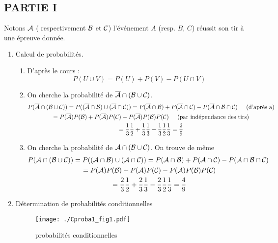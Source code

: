 \subsection*{PARTIE I}
Notons  $\cal A$ ( respectivement $\cal B$ et $\cal C$) l'événement $A$ (resp. $B$, $C$) réussit son tir à une épreuve donnée.
\begin{enumerate}
\item Calcul de probabilités.
\begin{enumerate}
\item  D'après le cours : $$P(U\cup V)=P(U)+P(V)-P(U\cap V)$$
 \item  On cherche la probabilité de $\overline{{\cal A}}\cap({\cal B}\cup {\cal C)}$.
 \begin{multline*}
 P(\overline{{\cal A}}\cap({\cal B}\cup {\cal C)}) 
  = P((\overline{{\cal A}}\cap{\cal B})\cup (\overline{{\cal A}}\cap{\cal C)})
  = P(\overline{{\cal A}}\cap{\cal B})+P(\overline{{\cal A}}\cap{\cal C}) -P(\overline{{\cal A}}\cap{\cal B}\cap{\cal C}) \hspace{0.5cm}\text{(d'après a)}\\
  = P(\overline{{\cal A}})P({\cal B}) +P(\overline{{\cal A}})P({\cal C}) - P(\overline{{\cal A}})P({\cal B})P({\cal C})
 \hspace{0.5cm}\text{(par indépendance des tirs)}\\
 = \frac 13\frac12+\frac13\frac13-\frac13\frac12\frac13 
 = \frac29
 \end{multline*}
 
\item On cherche la probabilité de ${\cal A}\cap({\cal B}\cup {\cal C)}$. On trouve de même
 \begin{multline*}
 P({{\cal A}}\cap({\cal B}\cup {\cal C)})
  = P(({{\cal A}}\cap{\cal B})\cup ({{\cal A}}\cap{\cal C)})
  = P({{\cal A}}\cap{\cal B})+P({{\cal A}}\cap{\cal C}) -P({{\cal A}}\cap{\cal B}\cap{\cal C})\ \\
  = P({{\cal A}})P({\cal B}) +P({{\cal A}})P({\cal C}) - P({{\cal A}})P({\cal B})P({\cal C})\\ 
  = \frac 23\frac12+\frac23\frac13-\frac23\frac12\frac13 
  = \frac49
 \end{multline*}
\end{enumerate}

\item Détermination de probabilités conditionnelles
\begin{figure}[h]
  \centering
  \texttt{[image: ./Cproba1\_fig1.pdf]}
  \caption{probabilités conditionnelles}
  \label{fig:Cproba1_fig1}
\end{figure}


\end{enumerate}
